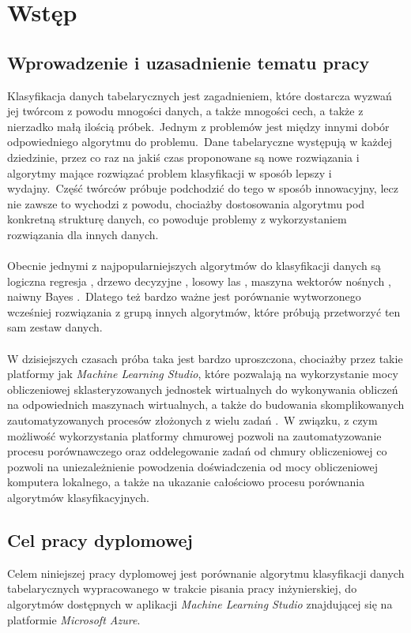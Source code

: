 \chapter{Wstęp}

\section{Wprowadzenie i uzasadnienie tematu pracy}
Klasyfikacja danych tabelarycznych jest zagadnieniem, które dostarcza wyzwań jej twórcom z powodu mnogości danych, a także mnogości cech, a także z nierzadko małą ilością próbek.\ Jednym z problemów jest między innymi dobór odpowiedniego algorytmu do problemu.\ Dane tabelaryczne występują w każdej dziedzinie, przez co raz na jakiś czas proponowane są nowe rozwiązania i algorytmy mające rozwiązać problem klasyfikacji w sposób lepszy i wydajny.\ Część twórców próbuje podchodzić do tego w sposób innowacyjny, lecz nie zawsze to wychodzi z powodu, chociażby dostosowania algorytmu pod konkretną strukturę danych, co powoduje problemy z wykorzystaniem rozwiązania dla innych danych.
\\ \\
Obecnie jednymi z najpopularniejszych algorytmów do klasyfikacji danych są logiczna regresja , drzewo decyzyjne , losowy las , maszyna wektorów nośnych , naiwny Bayes .\ Dlatego też bardzo ważne jest porównanie wytworzonego wcześniej rozwiązania z grupą innych algorytmów, które próbują przetworzyć ten sam zestaw danych.
\\ \\
W dzisiejszych czasach próba taka jest bardzo uproszczona, chociażby przez takie platformy jak \textit{Machine Learning Studio}, które pozwalają na wykorzystanie mocy obliczeniowej sklasteryzowanych jednostek wirtualnych do wykonywania obliczeń na odpowiednich maszynach wirtualnych, a także do budowania skomplikowanych zautomatyzowanych procesów złożonych z wielu zadań .\ W związku, z czym możliwość wykorzystania platformy chmurowej pozwoli na zautomatyzowanie procesu porównawczego oraz oddelegowanie zadań od chmury obliczeniowej co pozwoli na uniezależnienie powodzenia doświadczenia od mocy obliczeniowej komputera lokalnego, a także na ukazanie całościowo procesu porównania algorytmów klasyfikacyjnych.

\section{Cel pracy dyplomowej}
Celem niniejszej pracy dyplomowej jest porównanie algorytmu klasyfikacji danych tabelarycznych wypracowanego w trakcie pisania pracy inżynierskiej, do algorytmów dostępnych w aplikacji \textit{Machine Learning Studio} znajdującej się na platformie \textit{Microsoft Azure}.


